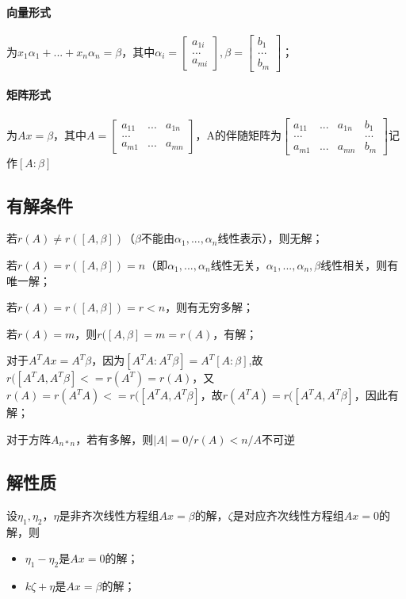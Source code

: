 \paragraph{向量形式}为\(x_1\alpha_1 + ... + x_n\alpha_n = \beta\)，其中\(\alpha_i = \begin{bmatrix}
a_{1i} \\ 
... \\ 
a_{mi}
\end{bmatrix}, \beta = \begin{bmatrix}
b_1 \\ 
... \\ 
b_m
\end{bmatrix}\)；

\paragraph{矩阵形式}为\(Ax = \beta\)，其中\(A = \begin{bmatrix}
a_{11} & ... & a_{1n} \\ 
... \\ 
a_{m1} & ... & a_{mn}
\end{bmatrix}\)，A的伴随矩阵为\(\begin{bmatrix}
a_{11} & ... & a_{1n} & b_1 \\ 
... & & & ... \\ 
a_{m1} & ... & a_{mn} & b_m
\end{bmatrix}\)记作\([A : \beta]\)

\subsection{有解条件}
若\(r(A) \neq r([A, \beta])\)（\(\beta\)不能由\(\alpha_1, ..., \alpha_n\)线性表示），则无解；

若\(r(A) = r([A, \beta]) = n\)（即\(\alpha_1, ..., \alpha_n\)线性无关，\(\alpha_1, ..., \alpha_n, \beta\)线性相关，则有唯一解；

若\(r(A) = r([A, \beta]) = r < n\)，则有无穷多解；

若\(r(A) = m\)，则\(r([A, \beta] = m = r(A)\)，有解；

对于\(A^TAx = A^T\beta\)，因为\([A^TA : A^T\beta] = A^T[A : \beta]\),故\(r([A^TA, A^T\beta] <= r(A^T) = r(A)\)，又\(r(A) = r(A^TA) <= r([A^TA, A^T\beta]\)，故\(r(A^TA) = r([A^TA, A^T\beta]\)，因此有解；

对于方阵\(A_{n * n}\)，若有多解，则\(|A| = 0/r(A) < n/A\text{不可逆}\)

\subsection{解性质}
设\(\eta_1, \eta_2\)，\(\eta\)是非齐次线性方程组\(Ax = \beta\)的解，\(\zeta\)是对应齐次线性方程组\(Ax = 0\)的解，则\begin{itemize}
    \item \(\eta_1 - \eta_2\)是\(Ax = 0\)的解；
    \item \(k\zeta + \eta\)是\(Ax = \beta\)的解；
\end{itemize}

